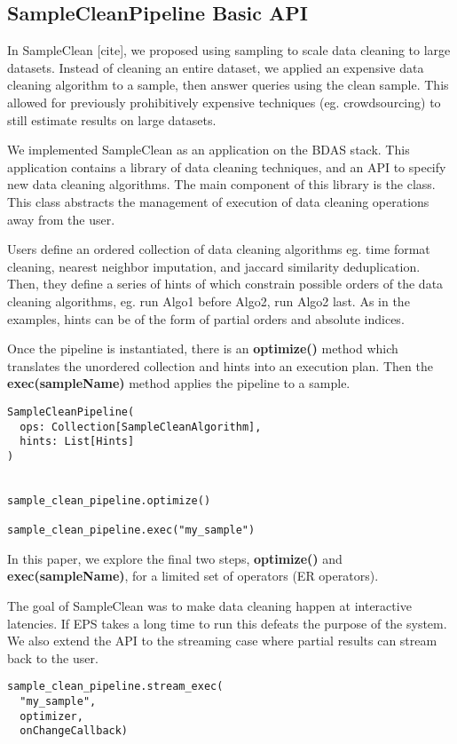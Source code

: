 \subsection{SampleCleanPipeline Basic API}
In SampleClean [cite], we proposed using sampling to scale data cleaning to large datasets.
Instead of cleaning an entire dataset, we applied an expensive data cleaning algorithm to a sample, then 
answer queries using the clean sample.
This allowed for previously prohibitively expensive techniques (eg. crowdsourcing) to still estimate results
on large datasets.

We implemented SampleClean as an application on the BDAS stack.
This application contains a library of data cleaning techniques, and an API to specify new data cleaning algorithms.
The main component of this library is the \scp class.
This class abstracts the management of execution of data cleaning operations away from the user.

Users define an ordered collection of data cleaning algorithms eg. time format cleaning, nearest neighbor imputation, and jaccard similarity deduplication.
Then, they define a series of hints of which constrain possible orders
of the data cleaning algorithms, eg. run Algo1 before Algo2, run Algo2 last.
As in the examples, hints can be of the form of partial orders and absolute indices.

Once the pipeline is instantiated, there is an \textbf{optimize()} method which
translates the unordered collection and hints into an execution plan.
Then the \textbf{exec(sampleName)} method applies the pipeline to a sample.

\begin{lstlisting}
SampleCleanPipeline( 
  ops: Collection[SampleCleanAlgorithm],
  hints: List[Hints] 
) 


sample_clean_pipeline.optimize()

sample_clean_pipeline.exec("my_sample")
\end{lstlisting}

In this paper, we explore the final two steps, \textbf{optimize()} and \textbf{exec(sampleName)}, 
for a limited set of operators (ER operators).

The goal of SampleClean was to make data cleaning happen at interactive latencies. 
If EPS takes a long time to run this defeats the purpose of the system.
We also extend the API to the streaming case where partial results can stream back to the user.

\begin{lstlisting}
sample_clean_pipeline.stream_exec(
  "my_sample", 
  optimizer,
  onChangeCallback)
\end{lstlisting}

